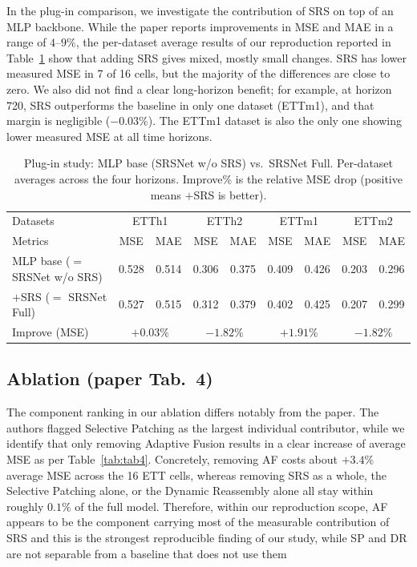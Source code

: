 \documentclass[10pt]{article}
\begin{document}
In the plug-in comparison, we investigate the contribution of SRS on
top of an MLP backbone. While the paper reports improvements in MSE and MAE
in a range of $4$--$9\%$, the per-dataset average results of our reproduction
reported in Table~\ref{tab:tab3} show that adding SRS gives mixed, mostly small
changes. SRS has lower measured MSE in 7 of 16 cells, but the majority of the differences
are close to zero. We also did not find a clear long-horizon benefit; for example, at
horizon 720, SRS outperforms the baseline in only one dataset (ETTm1), and that margin is
negligible ($-0.03\%$). The ETTm1 dataset is also the only one showing lower measured MSE at all
time horizons.

\begin{table}[t]
  \caption{Plug-in study: MLP base (SRSNet w/o SRS) vs.\ SRSNet
    Full. Per-dataset averages across the four horizons. Improve\%
    is the relative MSE drop (positive means $+$SRS is better).}
  \label{tab:tab3}
  \begin{center}
  \footnotesize
  \setlength{\tabcolsep}{4pt}
  \begin{tabular}{l|cc|cc|cc|cc}
    \toprule
    Datasets & \multicolumn{2}{c|}{ETTh1} & \multicolumn{2}{c|}{ETTh2}
             & \multicolumn{2}{c|}{ETTm1} & \multicolumn{2}{c}{ETTm2} \\
    Metrics  & MSE & MAE & MSE & MAE & MSE & MAE & MSE & MAE \\
    \midrule
    MLP base ($=$ SRSNet w/o SRS) & 0.528 & 0.514 & 0.306 & 0.375 & 0.409 & 0.426 & 0.203 & 0.296 \\
    $+$SRS ($=$ SRSNet Full)      & 0.527 & 0.515 & 0.312 & 0.379 & 0.402 & 0.425 & 0.207 & 0.299 \\
    \midrule
    Improve (MSE)                 & \multicolumn{2}{c|}{$+0.03\%$} & \multicolumn{2}{c|}{$-1.82\%$}
                                  & \multicolumn{2}{c|}{$+1.91\%$} & \multicolumn{2}{c}{$-1.82\%$} \\
    \bottomrule
  \end{tabular}
  \end{center}
\end{table}

\subsection{Ablation (paper Tab.~4)}

The component ranking in our ablation differs notably from the paper. The authors flagged Selective
Patching as the largest individual contributor, while we identify that only removing Adaptive Fusion
results in a clear increase of average MSE as per Table~\ref{tab:tab4}. Concretely, removing AF
costs about $+3.4\%$ average MSE across the 16 ETT cells, whereas removing SRS as a whole, the
Selective Patching alone, or the Dynamic Reassembly alone all stay within roughly $0.1\%$ of the
full model. Therefore, within our reproduction scope, AF appears to be the component carrying most of the measurable contribution of SRS and this is the strongest reproducible finding of our study, while SP and DR are not separable from a baseline that does not use them
\end{document}
